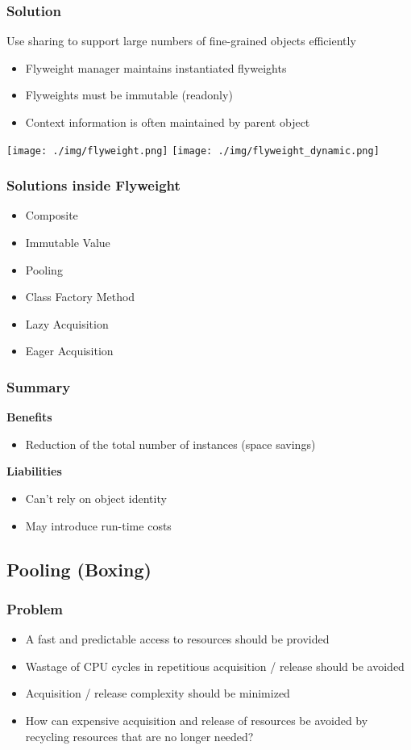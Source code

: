 \subsubsection{Solution}
Use sharing to support large numbers of fine-grained objects efficiently
\begin{itemize}
    \item Flyweight manager maintains instantiated flyweights
    \item Flyweights must be immutable (readonly)
    \item Context information is often maintained by parent object
\end{itemize}
\texttt{[image: ./img/flyweight.png]}
\texttt{[image: ./img/flyweight\_dynamic.png]}
\subsubsection{Solutions inside Flyweight}
\begin{itemize}
    \item Composite
    \item Immutable Value
    \item Pooling
    \item Class Factory Method
    \item Lazy Acquisition
    \item Eager Acquisition
\end{itemize}
\subsubsection{Summary}
\textbf{Benefits}
\begin{itemize}
    \item Reduction of the total number of instances (space savings)
\end{itemize}
\textbf{Liabilities}
\begin{itemize}
    \item Can't rely on object identity
    \item May introduce run-time costs
\end{itemize}

\subsection{Pooling (Boxing)}
\subsubsection{Problem}
\begin{itemize}
    \item A fast and predictable access to resources should be provided
    \item Wastage of CPU cycles in repetitious acquisition / release should be avoided
    \item Acquisition / release complexity should be minimized
    \item How can expensive acquisition and release of resources be avoided by recycling resources that are no longer needed?
\end{itemize}
